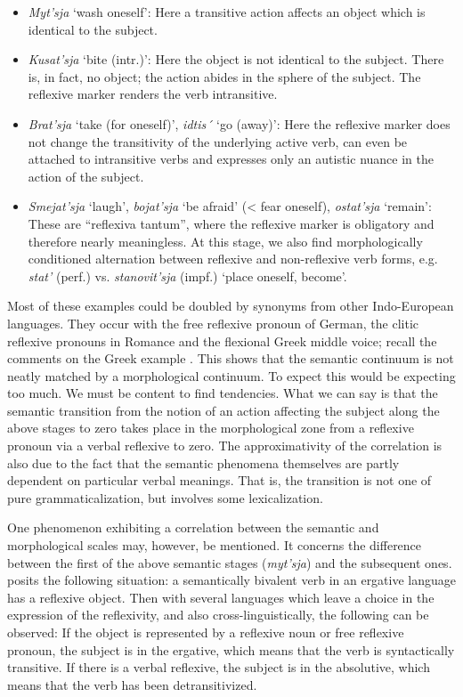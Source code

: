 \begin{itemize}

\item[] \textit{Myt'sja} ‘wash oneself’: Here a transitive action affects an object which is identical to the subject.

\item[] \textit{Kusat'sja} ‘bite (intr.)’: Here the object is not identical to the subject. There is, in fact, no object; the action abides in the sphere of the subject. The reflexive marker renders the verb intransitive.

\item[] \textit{Brat'sja} ‘take (for oneself)’, \textit{idtis´} ‘go (away)’: Here the reflexive marker does not change the transitivity of the underlying active verb, can even be attached to intransitive verbs and expresses only an autistic nuance in the action of the subject.

\item[] \textit{Smejat'sja} ‘laugh’, \textit{bojat'sja} ‘be afraid’ ({\textless} fear oneself), \textit{ostat'sja} ‘remain’: These are ``reflexiva tantum'', where the reflexive marker is obligatory and therefore nearly meaningless. At this stage, we also find morphologically conditioned alternation between reflexive and non-reflexive verb forms, e.g. \textit{stat'} (perf.) vs. \textit{stanovit'sja} (impf.) ‘place oneself, become’.

\end{itemize}

\noindent Most of these examples could be doubled by synonyms from other Indo-European languages. They occur with the free reflexive pronoun of German, the clitic reflexive pronouns in Romance and the flexional Greek middle voice; recall the comments on the Greek example . This shows that the semantic continuum is not neatly matched by a morphological continuum. To expect this would be expecting too much. We must be content to find tendencies. What we can say is that the semantic transition from the notion of an action affecting the subject along the above stages to zero takes place in the morphological zone from a reflexive pronoun via a verbal reflexive to zero. The approximativity of the correlation is also due to the fact that the semantic phenomena themselves are partly dependent on particular verbal meanings. That is, the transition is not one of pure grammaticalization, but involves some lexicalization.

One phenomenon exhibiting a correlation between the semantic and morphological scales may, however, be mentioned. It concerns the difference between the first of the above semantic stages (\textit{myt'sja}) and the subsequent ones. \citet[646f]{Edmondson1978} posits the following situation: a semantically bivalent verb in an ergative language has a reflexive object. Then with several languages which leave a choice in the expression of the reflexivity, and also cross-linguistically, the following can be observed: If the object is represented by a reflexive noun or free reflexive pronoun, the subject is in the ergative, which means that the verb is syntactically transitive. If there is a verbal reflexive, the subject is in the absolutive, which means that the verb has been detransitivized.

